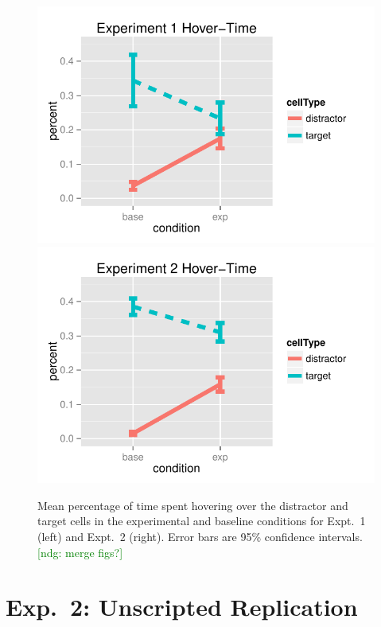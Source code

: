\documentclass[10pt,letterpaper]{article}
\newcommand{\ndg}[1]{\textcolor{Green}{[ndg: #1]}}
\begin{document}
 \begin{figure}[bt]
\begin{center}
\includegraphics[scale=.35]{images/exp1MouseTracking.pdf}
\includegraphics[scale=.35]{images/exp2MouseTracking.pdf}
\caption{Mean percentage of time spent hovering over the distractor and target cells in the experimental and baseline conditions for Expt.~1 (left) and Expt.~2 (right). Error bars are 95\% confidence intervals. \ndg{merge figs?}}
\label{fig:hover}
\end{center}
\end{figure}


\section{Exp.~2: Unscripted Replication}
\label{sec:Exp2}
\end{document}
